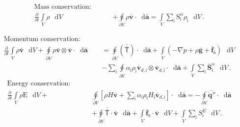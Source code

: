\documentclass[paper=a4,12pt,titlepage,listof=totoc,index=totoc,bibliography=totoc]{scrartcl}
\newcommand{\pderiv}[2]{\ensuremath{\displaystyle\frac{\partial{#1}}{\partial{#2}}}}
\newcommand{\vect}[1]{\bm{\bar{#1}}}    %
\newcommand{\tens}[1]{\bm{\bar{\bar{\mathsf{#1}}}}}
\newcommand{\integ}[2]{\ensuremath{\displaystyle\int\limits_{#1}^{#2}}}
\newcommand{\ointeg}[2]{\ensuremath{\displaystyle\oint\limits_{#1}^{#2}}}
\newcommand*\diff{\mathop{}\!\mathrm{d}}
\newcommand{\ind}[1]{\ensuremath{\mathsf {#1}}}
\begin{document}
\begin{equation*}\label{eq:vof-mass}
\begin{split}
\text{Mass conservation: }\qquad&\\  \pderiv{}{t}\integ{V}{} \rho\,\diff{V} &+
\ointeg{\partial V}{} \rho \vect{v} \cdot \diff{\vect{a}}
 =  \integ{V}{} \sum_{\ind{i}}\mathrm{S}^{\alpha}_{\ind{i}} \rho_{\ind{i}}\,\diff{V}\,.
\end{split}
\end{equation*}



\begin{equation*}\label{eq:vof-momentum}
\begin{split}
\text{Momentum conservation: }\qquad&\\   
\pderiv{}{t}\integ{V}{} \rho \vect{v}\,\diff{V} +
\ointeg{\partial V}{} \rho\vect{v} \otimes \vect{v} \cdot \diff{\vect{a}}
&= \ointeg{\partial V}{} \left(\tens{T}\right)\cdot\diff{\vect{a}} 
+ \integ{V}{} (-\nabla p + \rho \vect{g} + \vect{f}_{b}) \,\diff{V}\\
&- \sum_{\ind{i}}\ointeg{\partial V}{} \alpha_{\ind{i}} \rho_{\ind{i}} \vect{v}_{d,\ind{i}} \otimes \vect{v}_{d,\ind{i}} \cdot\diff{\vect{a}}
+ \integ{V}{} \sum_{\ind{i}}\vect{S}^{\alpha}_{\ind{i}}\,\diff{V}\,.
\end{split}
\end{equation*}
\begin{equation*}\label{eq:vof-energy}
\begin{split}
\text{Energy conservation: }\qquad&\\  
\pderiv{}{t}\integ{V}{}\rho \mathrm{E}\,\diff{V} +&
\ointeg{\partial V}{} \left[\rho H \vect{v} +  \sum_{\ind{i}}\alpha_{\ind{i}} \rho_{\ind{i}} H_{\ind{i}} \vect{v}_{d,\ind{i}}\right] \cdot \diff{\vect{a}}
 =  - \ointeg{\partial V}{} \vect{\dot{q}''}  \cdot \diff{\vect{a}}\\  &+ \ointeg{\partial V}{} \tens{T}\cdot\vect{v}\,\diff{\vect{a}} 
+ \integ{V}{}\vect{f}_{b}\cdot\vect{v}\,\diff{V}
+ \integ{V}{} \sum_{\ind{i}} S_{\ind{i}}^{E}\,\diff{V}\,.
\end{split}
\end{equation*}
\end{document}
